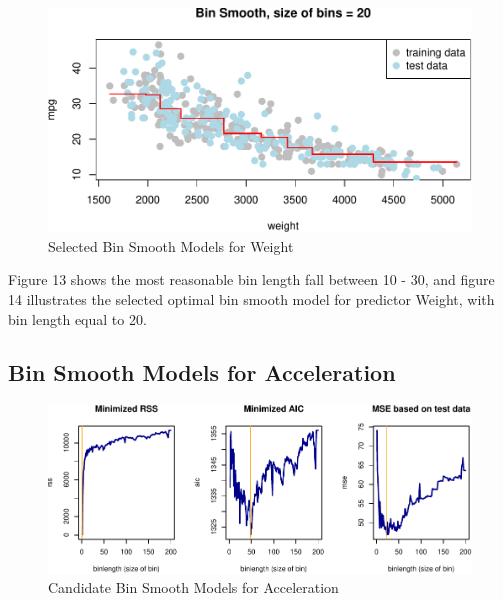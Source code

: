 \documentclass[]{article}
\begin{document}
\begin{figure}

{\centering \includegraphics{Report_files/figure-latex/bin-w-best-1} 

}

\caption{Selected Bin Smooth Models for Weight}\label{fig:bin-w-best}
\end{figure}

Figure 13 shows the most reasonable bin length fall between 10 - 30, and
figure 14 illustrates the selected optimal bin smooth model for
predictor Weight, with bin length equal to 20.

\hypertarget{bin-smooth-models-for-acceleration}{%
\subsection{Bin Smooth Models for
Acceleration}\label{bin-smooth-models-for-acceleration}}

\begin{figure}

{\centering \includegraphics{Report_files/figure-latex/bin-a-1} 

}

\caption{Candidate Bin Smooth Models for Acceleration}\label{fig:bin-a}
\end{figure}
\end{document}

